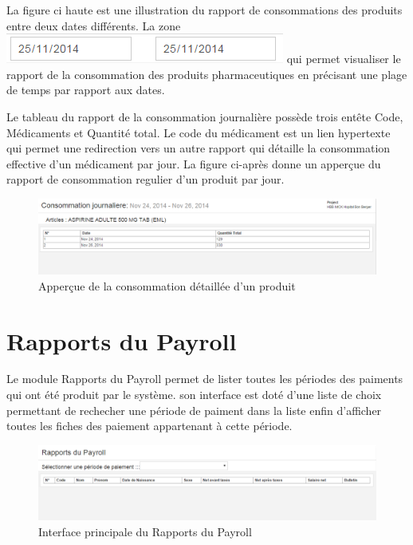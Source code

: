 \documentclass[12pt,a4paper]{report}
\begin{document}
La figure ci haute est une illustration du rapport de consommations des produits entre deux dates différents. La zone  \includegraphics[scale=0.7]{pic/PlageTimes.png} qui permet visualiser le rapport de la consommation des produits pharmaceutiques en précisant une plage de temps par rapport aux dates.

Le tableau du rapport de la consommation journalière possède trois entête Code, Médicaments et Quantité total. Le code du médicament est un lien hypertexte qui permet une redirection vers un autre rapport qui détaille la consommation effective d'un médicament par jour. La figure ci-après donne un apperçue du rapport de consommation regulier d'un produit par jour.

\begin{figure}[h]
\begin{center}
\includegraphics[width=14cm]{pic/ConsoDetJourn.png}
\end{center}
\caption{Apperçue de la consommation détaillée d'un produit}
\label{Apperçue de la consommation détaillée d'un produit}
\end{figure}

\newpage
\section{Rapports du Payroll}
Le module Rapports du Payroll permet de lister toutes les périodes des paiments qui ont été produit par le système. son interface est doté d'une liste de choix permettant de rechecher une période de paiment dans la liste enfin d'afficher toutes les fiches des paiement appartenant à cette période.

\begin{figure}[h]
\begin{center}
\includegraphics[width=14cm]{pic/RapPayroll.png}
\end{center}
\caption{Interface principale du Rapports du Payroll}
\label{Interface principale du Rapports du Payroll}
\end{figure}
\end{document}
